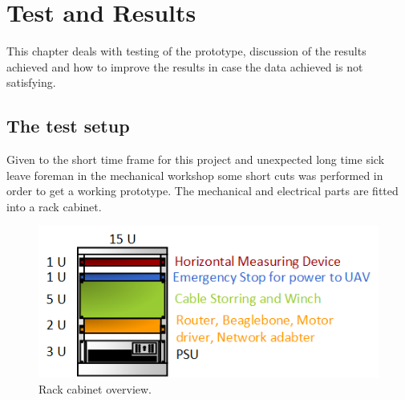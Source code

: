 
\chapter{Test and Results}
This chapter deals with testing of the prototype, discussion of the results achieved and how to improve the results in case the data achieved is not satisfying.  

\section{The test setup}
Given to the short time frame for this project and unexpected long time sick leave foreman in the mechanical workshop some short cuts was performed in order to get a working prototype. The mechanical and electrical parts are fitted into a rack cabinet.

\begin{figure}[hbtp]
  \centering
  \includegraphics[scale=1]{graphics/Visio/rack-setup.png}
  \caption{Rack cabinet overview.}
  \end{figure}   

